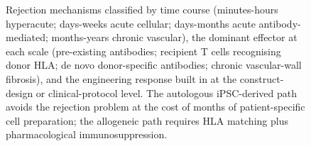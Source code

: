 \begin{figure}[htbp]
\begin{tikzpicture}
\end{tikzpicture}
\caption{Rejection mechanisms classified by time course (minutes-hours
hyperacute; days-weeks acute cellular; days-months acute
antibody-mediated; months-years chronic vascular), the dominant
effector at each scale (pre-existing antibodies; recipient T cells
recognising donor HLA; de novo donor-specific antibodies; chronic
vascular-wall fibrosis), and the engineering response built in at
the construct-design or clinical-protocol level. The autologous
iPSC-derived path avoids the rejection problem at the cost of months
of patient-specific cell preparation; the allogeneic path requires
HLA matching plus pharmacological immunosuppression.}
\label{fig:vol06ch05:rejection}
\end{figure}
